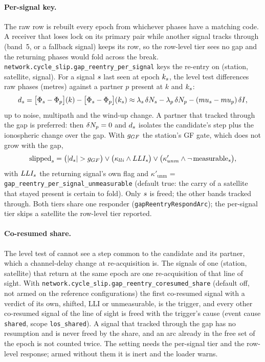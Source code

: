 \documentclass[main.tex]{subfiles}
\begin{document}
\paragraph{Per-signal key.}
The raw row is rebuilt every epoch from whichever phases have a matching
code. A receiver that loses lock on its primary pair while another signal
tracks through (band~5, or a fallback signal) keeps its row, so the
row-level tier sees no gap and the returning phases would fold across the
break. \texttt{network.cycle\_slip.gap\_reentry\_per\_signal}
keys the re-entry on (station, satellite, signal). For a signal $s$
last seen at epoch $k_s$, the level test differences raw phases
(metres) against a partner $p$ present at $k$ and $k_s$:
\begin{equation}
d_s
= \big[\Phi_s - \Phi_p\big](k) - \big[\Phi_s - \Phi_p\big](k_s)
\approx \lambda_s\,\delta N_s - \lambda_p\,\delta N_p - (mu_s - mu_p)\,\delta I ,
\label{eq:wire-sig-dgf}
\end{equation}
up to noise, multipath and the wind-up change. A partner that tracked
through the gap is preferred: then $\delta N_p = 0$ and $d_s$
isolates the candidate's step plus the ionospheric change over the gap.
With $g_{GF}$ the station's GF gate, which does not grow with the gap,
\begin{equation}
\text{slipped}_s = \big(|d_s| > g_{GF}\big) \vee
\big(\kappa_{lli} \wedge LLI_s\big) \vee
\big(\kappa'_{unm} \wedge \neg\,\text{measurable}_s\big),
\label{eq:wire-sig-verdict}
\end{equation}
with $LLI_s$ the returning signal's own flag and
$\kappa'_{\mathrm{unm}}$ = \texttt{gap\_reentry\_per\_signal\_unmeasurable}
(default true: the carry of a satellite that stayed present is certain
to fold). Only $s$ is freed; the other bands tracked through. Both
tiers share one responder (\texttt{gapReentryRespondArc}); the
per-signal tier skips a satellite the row-level tier reported.

\paragraph{Co-resumed share.}
The level test of  cannot see a step common to the
candidate and its partner, which a channel-delay change at re-acquisition
is. The signals of one (station, satellite) that return at the same epoch
are one re-acquisition of that line of sight. With
\texttt{network.cycle\_slip.gap\_reentry\_coresumed\_share} (default off,
not armed on the reference configurations) the first co-resumed signal
with a verdict of its own, shifted, LLI or unmeasurable, is the trigger,
and every other co-resumed signal of the line of sight is freed with the
trigger's cause (event cause \texttt{shared}, scope \texttt{los\_shared}). A
signal that tracked through the gap has no resumption and is never freed
by the share, and an arc already in the free set of the epoch is not
counted twice. The setting needs the per-signal tier and the row-level
response; armed without them it is inert and the loader warns.
\end{document}
